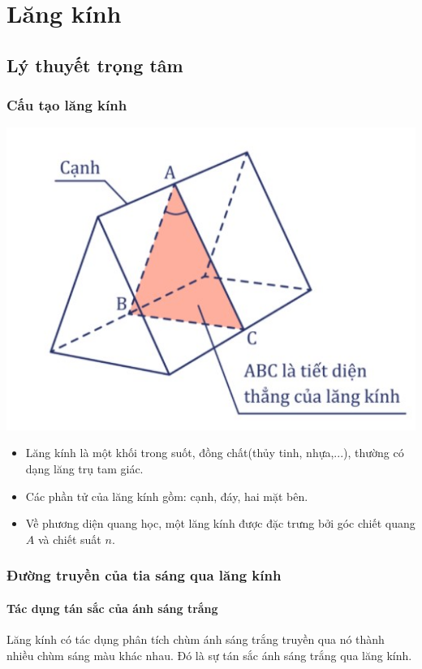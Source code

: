 \chapter{Lăng kính}
\section{Lý thuyết trọng tâm}
\subsection{Cấu tạo lăng kính}
		\begin{center}
			\includegraphics[scale=0.65]{../figs/VN11-PH-37-L-025-1-h2.jpg}
		\end{center}
	\begin{itemize}
		\item Lăng kính là một khối trong suốt, đồng chất(thủy tinh, nhựa,...), thường có dạng lăng trụ tam giác.
		\item Các phần tử của lăng kính gồm: cạnh, đáy, hai mặt bên.
		\item Về phương diện quang học, một lăng kính được đặc  trưng bởi góc chiết quang $A$ và chiết suất $n$.
			\end{itemize}

	\subsection{Đường truyền của tia sáng qua lăng kính}
	
\subsubsection{Tác dụng tán sắc của ánh sáng trắng}
	Lăng kính có tác dụng phân tích chùm ánh sáng trắng truyền qua nó thành nhiều chùm sáng màu khác nhau. Đó là sự tán sắc ánh sáng trắng qua lăng kính.
